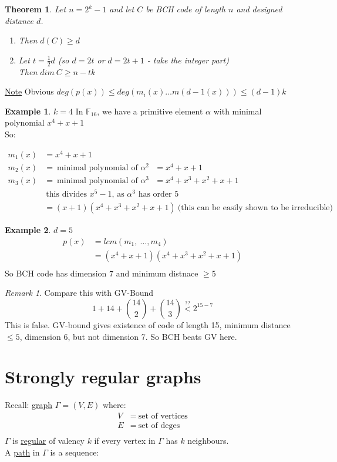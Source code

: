 \documentclass[]{article}
\newtheorem{thm}{Theorem}[section]
\theoremstyle{definition}
\newtheorem*{exmp}{Example}
\theoremstyle{remark}
\newtheorem*{rem}{Remark}
\numberwithin{equation}{section}
\begin{document}
				\begin{thm}Let $n=2^k-1$ and let $C$ be BCH code of length $n$ and designed distance $d$.
					\begin{enumerate}
						\item Then $d(C) \geq d$
						\item Let $t=\frac{1}{2}d$ (so $d=2t$ or $d=2t+1$ - take the integer part)\\
						Then $dim\ C \geq n - tk$
					\end{enumerate}
				\end{thm}
				\underline{Note} Obvious $deg(p(x))\leq deg(m_i(x) \hdots m(d-1(x)))\leq (d-1)k$

				\begin{exmp}$k=4$\hfill
					In $\mathbb{F}_{16}$, we have a primitive element $\alpha$ with minimal polynomial $x^4 + x + 1$\\
					So:

					\begin{align*}
						m_1(x) &= x^4 + x + 1\\
						m_2(x) &=\ \text{minimal polynomial of $\alpha^2$ } = x^4 + x + 1\\
						m_3(x) &=\ \text{minimal polynomial of $\alpha^3$ } = x^4 + x^3 + x^2 + x + 1\\
							   &\ \text{this divides $x^5 - 1$, as $\alpha^3$ has order $5$}\\
							   &= (x+1)(x^4+x^3+x^2+x+1)\ \text{(this can be easily shown to be irreducible)}
					\end{align*}
				\end{exmp}
				\begin{exmp}$d = 5$
					\begin{align*}
						p(x) &= lcm(m_1,\ \hdots, m_4)\\
							 &= (x^4+x+1)(x^4+x^3+x^2+x+1)\\
					\end{align*}
					So BCH code has dimension $7$ and minimum distnace $\geq 5$
				\end{exmp}
				\begin{rem} Compare this with GV-Bound
				\[
					1 + 14 + \binom{14}{2} + \binom{14}{3} \overset{??}{<} 2^{15-7}
				\]
				This is false. GV-bound gives existence of code of length 15, minimum distance $\leq 5$, dimension 6, but not dimension 7. So BCH beats GV here.
				\end{rem}
\section{Strongly regular graphs}
	Recall: \underline{graph} $\Gamma = (V,E)$ where:
		\begin{align*}
			V &=\ \text{set of vertices}\\
			E &=\ \text{set of deges}\\
		\end{align*}
	$\Gamma$ is \underline{regular} of valency $k$ if every vertex in $\Gamma$ has $k$ neighbours.\\
	A \underline{path} in $\Gamma$ is a sequence:
\end{document}
